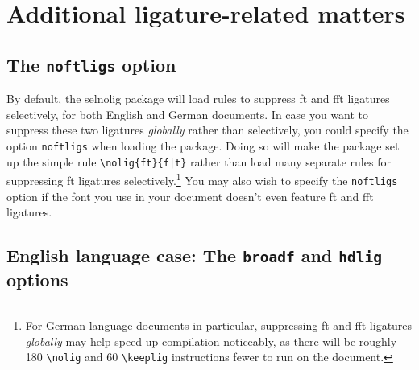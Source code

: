 \documentclass[11pt]{article}
\newcommand{\pkg}[1]{\textsf{#1}}
\newcommand{\opt}[1]{\texttt{#1}}
\newcommand{\cmmd}[1]{\texttt{\textbackslash #1}}
\begin{document}
\section{Additional ligature-related matters}
\label{sec:options}


%
%
%

\subsection{The \opt{noftligs} option}

By default, the \pkg{selnolig} package will load rules to suppress ft and fft ligatures selectively, for both English and German documents. In case you want to suppress these two ligatures \emph{globally} rather than selectively, you could specify the option \opt{noftligs} when loading the package. Doing so will make the package set up the simple rule \Verb+\nolig{ft}{f|t}+ rather than load many separate rules for suppressing ft ligatures selectively.\footnote{For German language documents in particular, suppressing ft and fft ligatures \emph{globally} may help speed up compilation noticeably, as there will be roughly 180 \cmmd{nolig} and 60 \cmmd{keeplig} instructions fewer to run on the document.} You may also wish to specify the \opt{noftligs} option if the font you use in your document doesn't even feature ft and fft ligatures.



\subsection[English language case: The broadf and hdlig options]{English language case: The \opt{broadf} and \opt{hdlig} options} \label{sec:eng-opt}
\end{document}
